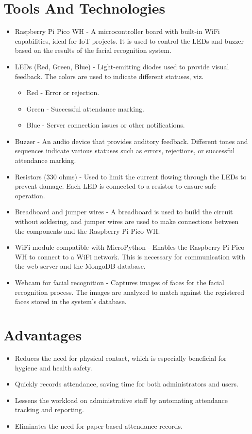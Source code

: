 \documentclass[12pt,a4paper]{report}
\begin{document}
\section{Tools And Technologies}
\begin{itemize}
	\item Raspberry Pi Pico WH - A microcontroller board with built-in WiFi capabilities, ideal for IoT projects. It is used to control the LEDs and buzzer based on the results of the facial recognition system.
	\item LEDs (Red, Green, Blue) - Light-emitting diodes used to provide visual feedback. The colors are used to indicate different statuses, viz.
		\begin{itemize}
			\item Red - Error or rejection.
			\item Green - Successful attendance marking.
			\item Blue - Server connection issues or other notifications.
		\end{itemize}
	\item Buzzer - An audio device that provides auditory feedback. Different tones and sequences indicate various statuses such as errors, rejections, or successful attendance marking.
	\item Resistors (330 ohms) - Used to limit the current flowing through the LEDs to prevent damage. Each LED is connected to a resistor to ensure safe operation.
	\item Breadboard and jumper wires - A breadboard is used to build the circuit without soldering, and jumper wires are used to make connections between the components and the Raspberry Pi Pico WH.
	\item WiFi module compatible with MicroPython - Enables the Raspberry Pi Pico WH to connect to a WiFi network. This is necessary for communication with the web server and the MongoDB database.
	\item Webcam for facial recognition - Captures images of faces for the facial recognition process. The images are analyzed to match against the registered faces stored in the system's database.
\end{itemize}

\section{Advantages}
\begin{itemize}
	\item Reduces the need for physical contact, which is especially beneficial for hygiene and health safety.
	\item Quickly records attendance, saving time for both administrators and users.
	\item Lessens the workload on administrative staff by automating attendance tracking and reporting.
	\item Eliminates the need for paper-based attendance records.
\end{itemize}
\end{document}
